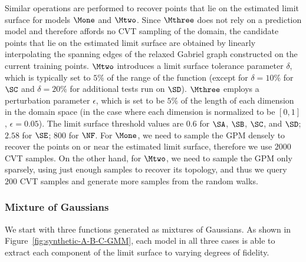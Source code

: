 Similar operations are performed to recover points that lie on the estimated limit surface for models $\Mone$ and $\Mtwo$.
%
Since $\Mthree$ does not rely on a prediction model and therefore affords no CVT sampling of the domain, the candidate points that lie on the estimated limit surface are obtained by linearly interpolating the spanning edges of the relaxed Gabriel graph constructed on the current training points.
%
$\Mtwo$ introduces a limit surface tolerance parameter $\delta$, which is typically set to $5\%$ of the range of the function (except for $\delta = 10\%$ for $\SC$ and $\delta = 20\%$ for additional tests run on $\SD$).
%
$\Mthree$ employs a perturbation parameter $\epsilon$, which is set to be $5\%$ of the length of each dimension in the domain space (in the case where each dimension is normalized to be $[0,1]$, $\epsilon = 0.05$).
%
The limit surface threshold values are $0.6$ for $\SA$, $\SB$, $\SC$, and $\SD$;
%
$2.58$ for $\SE$; $800$ for $\NF$.
%
For $\Mone$, we need to sample the GPM densely to recover the points on or near the estimated limit surface, therefore we use $2000$ CVT samples.
%
On the other hand, for $\Mtwo$, we need to sample the GPM only sparsely, using just enough samples to recover its topology, and thus we query $200$ CVT samples and generate more samples from the random walks.


\subsubsection{Mixture of Gaussians}

We start with three functions generated as mixtures of Gaussians.
%
As shown in Figure~\ref{fig:synthetic-A-B-C-GMM}, each model in all three cases is able to extract each component of the limit surface to varying degrees of fidelity.

